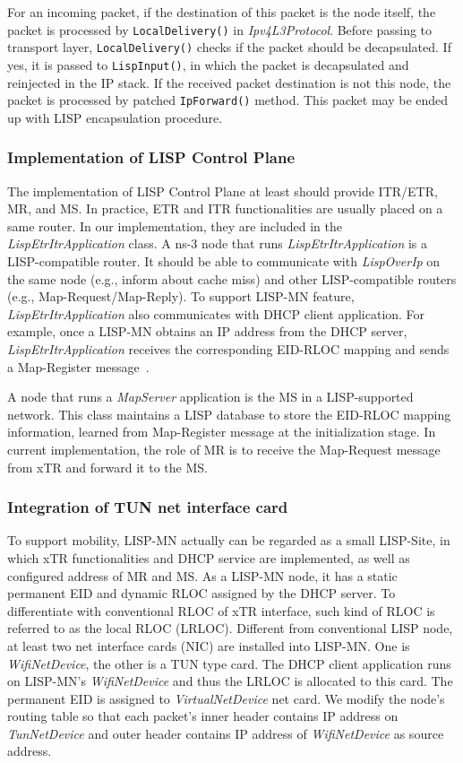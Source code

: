 For an incoming packet, if the destination of this packet is the node itself,
the packet is processed by \texttt{LocalDelivery()} in \emph{Ipv4L3Protocol}.
Before passing to transport layer, \texttt{LocalDelivery()} checks if the packet
should be decapsulated. If yes, it is passed to \texttt{LispInput()}, in
which the packet is decapsulated and reinjected in the IP stack. If the received
packet destination is not this node, the packet is processed by patched
\texttt{IpForward()} method. This packet may be ended up with LISP encapsulation
procedure.


\subsubsection{Implementation of LISP Control Plane}\label{subsec:control-plane-impl}
The implementation of LISP Control Plane at least should provide ITR/ETR, MR,
and MS. In practice, ETR and ITR functionalities are usually placed on a same
router. In our implementation, they are included in the
\emph{LispEtrItrApplication} class. A ns-3 node that runs
\emph{LispEtrItrApplication} is a LISP-compatible router. It should be able to
communicate with \emph{LispOverIp} on the same node (e.g., inform about cache
miss) and other LISP-compatible routers (e.g., Map-Request/Map-Reply). To
support LISP-MN feature, \emph{LispEtrItrApplication} also communicates with
DHCP client application. For example, once a LISP-MN obtains an IP address from
the DHCP server, \emph{LispEtrItrApplication} receives the corresponding
EID-RLOC mapping and sends a Map-Register message~\cite{meyer-lisp-mn-16}.

A node that runs a \emph{MapServer} application is the MS in a LISP-supported
network. This class maintains a LISP database to store the EID-RLOC mapping
information, learned from Map-Register message at the initialization stage. In
current implementation, the role of MR is to receive the Map-Request message
from xTR and forward it to the MS.

\subsubsection{Integration of TUN net interface card}\label{subsec:tundevice}
To support mobility, LISP-MN actually can be regarded as a small LISP-Site, in
which xTR functionalities and DHCP service are implemented, as well as
configured address of MR and MS. As a LISP-MN node, it has a static permanent
EID and dynamic RLOC assigned by the DHCP server. To differentiate with
conventional RLOC of xTR interface, such kind of RLOC is referred to as the
local RLOC (LRLOC). Different from conventional LISP node, at least two net
interface cards (NIC) are installed into LISP-MN. One is \emph{WifiNetDevice},
the other is a TUN type card. The DHCP client application runs on LISP-MN's
\emph{WifiNetDevice} and thus the LRLOC is allocated to this card. The permanent
EID is assigned to \emph{VirtualNetDevice} net card. We modify the node's
routing table so that each packet's inner header contains IP address on
\emph{TunNetDevice} and outer header contains IP address of \emph{WifiNetDevice}
as source address.

